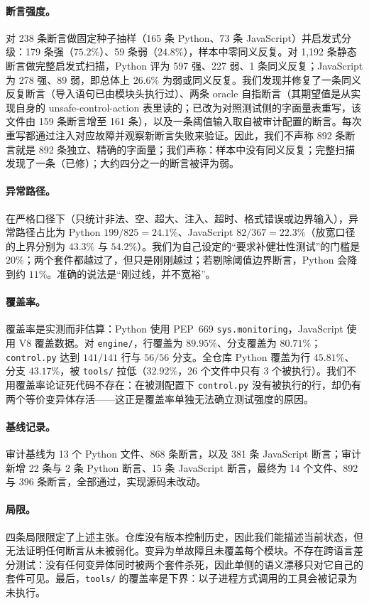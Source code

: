 \paragraph{断言强度。} 对 238 条断言做固定种子抽样（165 条 Python、73 条 JavaScript）并启发式分级：179 条强（$75.2\%$）、59 条弱（$24.8\%$），样本中零同义反复。对 1{,}192 条静态断言做完整启发式扫描，Python 评为 597 强、227 弱、1 条同义反复；JavaScript 为 278 强、89 弱，即总体上 $26.6\%$ 为弱或同义反复。我们发现并修复了一条同义反复断言（导入语句已由模块头执行过）、两条 oracle 自指断言（其期望值是从实现自身的 unsafe-control-action 表里读的；已改为对照测试侧的字面量表重写，该文件由 159 条断言增至 161 条），以及一条阈值输入取自被审计配置的断言。每次重写都通过注入对应故障并观察新断言失败来验证。因此，我们不声称 892 条断言就是 892 条独立、精确的字面量；我们声称：样本中没有同义反复；完整扫描发现了一条（已修）；大约四分之一的断言被评为弱。

\paragraph{异常路径。} 在严格口径下（只统计非法、空、超大、注入、超时、格式错误或边界输入），异常路径占比为 Python $199/825=24.1\%$、JavaScript $82/367=22.3\%$（放宽口径的上界分别为 $43.3\%$ 与 $54.2\%$）。我们为自己设定的“要求补健壮性测试”的门槛是 $20\%$；两个套件都越过了，但只是刚刚越过；若剔除阈值边界断言，Python 会降到约 $11\%$。准确的说法是“刚过线，并不宽裕”。

\paragraph{覆盖率。} 覆盖率是实测而非估算：Python 使用 PEP~669 \texttt{sys.monitoring}，JavaScript 使用 V8 覆盖数据。对 \texttt{engine/}，行覆盖为 $89.95\%$、分支覆盖为 $80.71\%$；\texttt{control.py} 达到 $141/141$ 行与 $56/56$ 分支。全仓库 Python 覆盖为行 $45.81\%$、分支 $43.17\%$，被 \texttt{tools/} 拉低（$32.92\%$，26 个文件中只有 3 个被执行）。我们不用覆盖率论证死代码不存在：在被测配置下 \texttt{control.py} 没有被执行的行，却仍有两个等价变异体存活——这正是覆盖率单独无法确立测试强度的原因。

\paragraph{基线记录。} 审计基线为 13 个 Python 文件、868 条断言，以及 381 条 JavaScript 断言；审计新增 22 条与 2 条 Python 断言、15 条 JavaScript 断言，最终为 14 个文件、892 与 396 条断言，全部通过，实现源码未改动。

\paragraph{局限。} 四条局限限定了上述主张。仓库没有版本控制历史，因此我们能描述当前状态，但无法证明任何断言从未被弱化。变异为单故障且未覆盖每个模块。不存在跨语言差分测试：没有任何变异体同时被两个套件杀死，因此单侧的语义漂移只对它自己的套件可见。最后，\texttt{tools/} 的覆盖率是下界：以子进程方式调用的工具会被记录为未执行。
